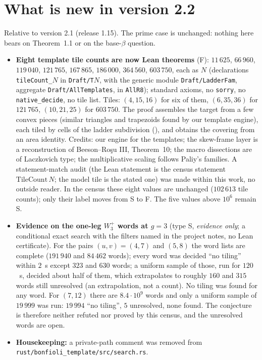 \documentclass[11pt,reqno]{amsart}
\theoremstyle{plain}
\theoremstyle{definition}
\newcommand{\sF}{\textup{\textsf{F}}}
\newcommand{\sS}{\textup{\textsf{S}}}
\begin{document}
\section{What is new in version 2.2}\label{sec:new22}
Relative to version 2.1 (release 1.15). The prime case is unchanged: nothing here bears on Theorem~1.1 or on the base-$\beta$ question.
\begin{itemize}
\item \textbf{Eight template tile counts are now Lean theorems} (\sF): $11\,625$, $66\,960$, $119\,040$, $121\,765$, $167\,865$, $186\,000$, $364\,560$, $603\,750$, each as  $N$ (declarations \texttt{tileCount\_$N$} in \texttt{Draft/T$N$}, with the generic module \texttt{Draft/LadderFam}, aggregate \texttt{Draft/AllTemplates}, in \texttt{AllR8}); standard axioms, no \texttt{sorry}, no \texttt{native\_decide}, no tile list. Tiles: $(4,15,16)$ for six of them, $(6,35,36)$ for $121\,765$, $(10,21,25)$ for $603\,750$. The proof assembles the target from a few convex pieces (similar triangles and trapezoids found by our template engine), each tiled by cells of the ladder subdivision (), and obtains the covering from an area identity. Credits: our engine for the templates; the skew-frame layer is a reconstruction of Beeson--Ro\c{s}u III, Theorem~10; the macro dissections are of Laczkovich type; the multiplicative scaling follows Paliy's families. A statement-match audit (the Lean statement is the census statement $\mathrm{TileCount}\,N$; the model tile is the stated one) was made within this work, no outside reader. In the census these eight values are unchanged ($102\,613$ tile counts); only their label moves from \sS{} to \sF. The five values above $10^6$ remain \sS.
\item \textbf{Evidence on the one-leg $W_3^+$ words at $g=3$} (type \sS, \emph{evidence only}; a conditional exact search with the filters named in the project notes, no Lean certificate). For the pairs $(u,v)=(4,7)$ and $(5,8)$ the word lists are complete ($191\,940$ and $84\,462$ words); every word was decided ``no tiling'' within $2$~s except $323$ and $630$ words; a uniform sample of those, run for $120$~s, decided about half of them, which extrapolates to roughly $160$ and $315$ words still unresolved (an extrapolation, not a count). No tiling was found for any word. For $(7,12)$ there are $8.4\cdot10^9$ words and only a uniform sample of $19\,999$ was run: $19\,994$ ``no tiling'', $5$ unresolved, none found. The conjecture is therefore neither refuted nor proved by this census, and the unresolved words are open.
\item \textbf{Housekeeping:} a private-path comment was removed from \texttt{rust/bonfioli\_template/src/search.rs}.
\end{itemize}
\end{document}
